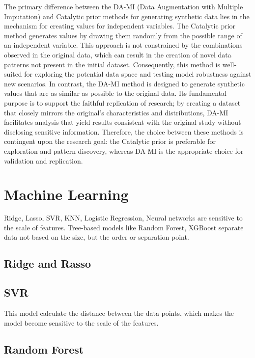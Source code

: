 \documentclass[sn-basic,pdflatex]{sn-jnl}
\theoremstyle{remark}
\theoremstyle{definition}
\begin{document}
The primary difference between the DA-MI (Data Augmentation with
Multiple Imputation) and Catalytic prior methods for generating
synthetic data lies in the mechanism for creating values for independent
variables. The Catalytic prior method generates values by drawing them
randomly from the possible range of an independent variable. This
approach is not constrained by the combinations observed in the original
data, which can result in the creation of novel data patterns not
present in the initial dataset. Consequently, this method is well-suited
for exploring the potential data space and testing model robustness
against new scenarios. In contrast, the DA-MI method is designed to
generate synthetic values that are as similar as possible to the
original data. Its fundamental purpose is to support the faithful
replication of research; by creating a dataset that closely mirrors the
original's characteristics and distributions, DA-MI facilitates analysis
that yield results consistent with the original study without disclosing
sensitive information. Therefore, the choice between these methods is
contingent upon the research goal: the Catalytic prior is preferable for
exploration and pattern discovery, whereas DA-MI is the appropriate
choice for validation and replication.

\section{Machine Learning}\label{sec3}

Ridge, Lasso, SVR, KNN, Logistic Regression, Neural networks are
sensitive to the scale of features. Tree-based models like Random
Forest, XGBoost separate data not based on the size, but the order or
separation point.

\subsection{Ridge and Rasso}\label{subsec3-1}

\subsection{SVR}\label{subsec3-2}

This model calculate the distance between the data points, which makes
the model become sensitive to the scale of the features.

\subsection{Random Forest}\label{subsec3-3}
\end{document}
